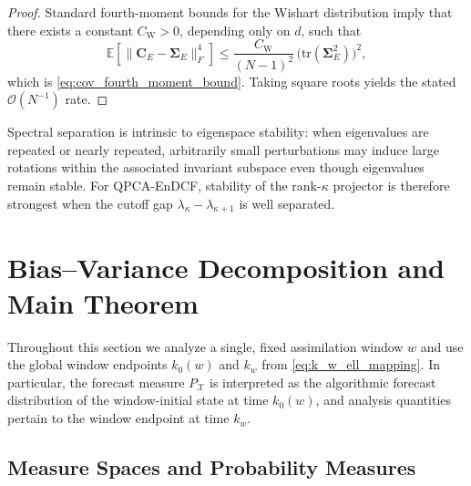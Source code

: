 \documentclass[11pt,a4paper]{article}
\begin{document}
\begin{proof}
\smallskip
\noindent Standard fourth-moment bounds for the Wishart distribution imply that there exists a constant $C_{\mathrm{W}}>0$, depending only on $d$, such that
\begin{equation}
\mathbb{E}\!\left[\|\mathbf{C}_E-\boldsymbol{\Sigma}_E\|_F^4\right]
\le
\frac{C_{\mathrm{W}}}{(N-1)^2}\,\bigl(\mathrm{tr}(\boldsymbol{\Sigma}_E^2)\bigr)^2,
\end{equation}
which is \eqref{eq:cov_fourth_moment_bound}. Taking square roots yields the stated $\mathcal{O}(N^{-1})$ rate.
\end{proof}

Spectral separation is intrinsic to eigenspace stability: when eigenvalues are repeated or nearly repeated, arbitrarily small perturbations may induce large rotations within the associated invariant subspace even though eigenvalues remain stable. For QPCA-EnDCF, stability of the rank-$\kappa$ projector is therefore strongest when the cutoff gap $\lambda_\kappa-\lambda_{\kappa+1}$ is well separated.




\section{Bias--Variance Decomposition and Main Theorem}
\label{sec:bv_decomposition}

Throughout this section we analyze a single, fixed assimilation window $w$ and use the global window endpoints $k_0(w)$ and $k_w$ from \eqref{eq:k_w_ell_mapping}. In particular, the forecast measure $P_{\mathcal{X}}$ is interpreted as the algorithmic forecast distribution of the window-initial state at time $k_0(w)$, and analysis quantities pertain to the window endpoint at time $k_w$.




\subsection{Measure Spaces and Probability Measures}
\label{subsec:measure_spaces}
\end{document}

